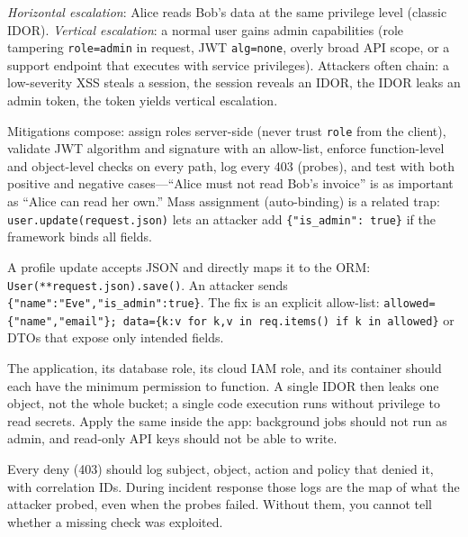 \emph{Horizontal escalation}: Alice reads Bob's data at the same privilege level (classic IDOR). \emph{Vertical escalation}: a normal user gains admin capabilities (role tampering \texttt{role=admin} in request, JWT \texttt{alg=none}, overly broad API scope, or a support endpoint that executes with service privileges). Attackers often chain: a low-severity XSS steals a session, the session reveals an IDOR, the IDOR leaks an admin token, the token yields vertical escalation.

Mitigations compose: assign roles server-side (never trust \texttt{role} from the client), validate JWT algorithm and signature with an allow-list, enforce function-level and object-level checks on every path, log every 403 (probes), and test with both positive and negative cases---``Alice must not read Bob's invoice'' is as important as ``Alice can read her own.'' Mass assignment (auto-binding) is a related trap: \texttt{user.update(request.json)} lets an attacker add \texttt{\{"is\_admin": true\}} if the framework binds all fields.

\begin{example}
A profile update accepts JSON and directly maps it to the ORM: \texttt{User(**request.json).save()}. An attacker sends \texttt{\{"name":"Eve","is\_admin":true\}}. The fix is an explicit allow-list: \texttt{allowed=\{"name","email"\}; data=\{k:v for k,v in req.items() if k in allowed\}} or DTOs that expose only intended fields.
\end{example}

\begin{remark}
The application, its database role, its cloud IAM role, and its container should each have the minimum permission to function. A single IDOR then leaks one object, not the whole bucket; a single code execution runs without privilege to read secrets. Apply the same inside the app: background jobs should not run as admin, and read-only API keys should not be able to write.
\end{remark}

\begin{remark}[Auditability]
Every deny (403) should log subject, object, action and policy that denied it, with correlation IDs. During incident response those logs are the map of what the attacker probed, even when the probes failed. Without them, you cannot tell whether a missing check was exploited.
\end{remark}

